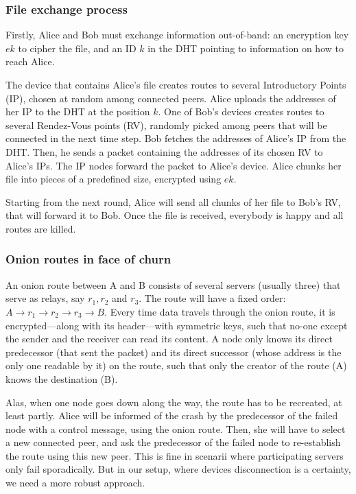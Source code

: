 \subsubsection{File exchange process}%
\label{ssub:file_exchange_process}

Firstly, Alice and Bob must exchange information out-of-band: an encryption key $ek$ to cipher the file, and an ID $k$ in the DHT pointing to information on how to reach Alice.

The device that contains Alice's file  creates routes to several Introductory Points (IP), chosen at random among connected peers.
Alice uploads the addresses of her IP to the DHT at the position $k$.
One of Bob's devices creates routes to several Rendez-Vous points (RV), randomly picked among peers that will be connected in the next time step.
Bob fetches the addresses of Alice's IP from the \ac{DHT}.
Then, he sends a packet containing the addresses of its chosen RV to Alice's IPs.
The IP nodes forward the packet to Alice's device. 
Alice chunks her file into pieces of a predefined size, encrypted using $ek$.

Starting from the next round, Alice will send all chunks of her file to Bob's RV, that will forward it to Bob.
Once the file is received, everybody is happy and all routes are killed.


\subsubsection{Onion routes in face of churn}%
\label{ssub:onion_routes_in_face_of_churn}

An onion route between A and B consists of several servers (usually three) that serve as relays, say $r_1, r_2$ and $r_3$. 
The route will have a fixed order: $A \rightarrow r_1 \rightarrow r_2 \rightarrow r_3 \rightarrow B$.
Every time data travels through the onion route, it is encrypted---along with its header---with symmetric keys, such that no-one except the sender and the receiver can read its content.
A node only knows its direct predecessor (that sent the packet) and its direct successor (whose address is the only one readable by it) on the route, such that only the creator of the route (A) knows the destination (B).

Alas, when one node goes down along the way, the route has to be recreated, at least partly.
Alice will be informed of the crash by the predecessor of the failed node with a control message, using the onion route.
Then, she will have to select a new connected peer, and ask the predecessor of the failed node to re-establish the route using this new peer.
This is fine in scenarii where participating servers only fail sporadically.
But in our setup, where devices disconnection is a certainty, we need a more robust approach.


